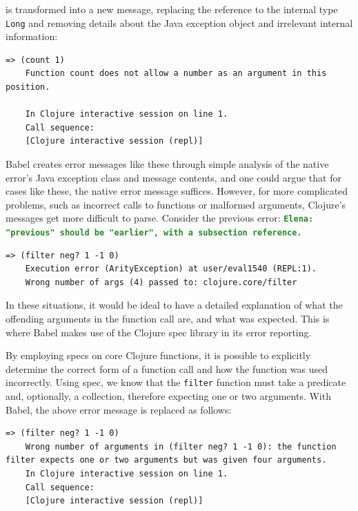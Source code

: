 \documentclass[12pt]{article}
\newcommand{\comment}[1]{{\bf \tt  {#1}}}
\newcommand{\emcomment}[1]{\textcolor{ForestGreen}{\comment{Elena: {#1}}}}
\begin{document}
is transformed into a new message, replacing the reference to the internal type \verb|Long| and removing details about the Java exception object and irrelevant internal information:

\begin{lstlisting}[breaklines=true, basicstyle=\ttfamily]
    => (count 1)
    Function count does not allow a number as an argument in this position.

    In Clojure interactive session on line 1.
    Call sequence:
    [Clojure interactive session (repl)]
\end{lstlisting}

Babel creates error messages like these through simple analysis of the native error's Java exception class and message contents, and one could argue that for cases like these, the native error message suffices. However, for more complicated problems, such as incorrect calls to functions or malformed arguments, Clojure's messages get more difficult to parse. Consider the previous error: \emcomment{"previous" should be "earlier", with a subsection reference.} 

\begin{lstlisting}[breaklines=true, basicstyle=\ttfamily]
    => (filter neg? 1 -1 0)
    Execution error (ArityException) at user/eval1540 (REPL:1).
    Wrong number of args (4) passed to: clojure.core/filter
\end{lstlisting}

In these situations, it would be ideal to have a detailed explanation of what the offending arguments in the function call are, and what was expected. This is where Babel makes use of the Clojure spec library in its error reporting.

By employing specs on core Clojure functions, it is possible to explicitly determine the correct form of a function call and how the function was used incorrectly. Using spec, we know that the \verb|filter| function must take a predicate and, optionally, a collection, therefore expecting one or two arguments. With Babel, the above error message is replaced as follows:

\begin{lstlisting}[breaklines=true, basicstyle=\ttfamily]
    => (filter neg? 1 -1 0)
    Wrong number of arguments in (filter neg? 1 -1 0): the function filter expects one or two arguments but was given four arguments.
    In Clojure interactive session on line 1.
    Call sequence:
    [Clojure interactive session (repl)]
\end{lstlisting}
\end{document}

